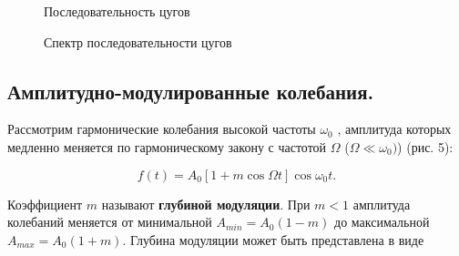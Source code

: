 \documentclass[a4paper, 14pt]{extarticle}%
\begin{document}
	\begin{figure}[h]
		\begin{minipage}[h]{0.5\linewidth}
			\caption{Последовательность цугов}
		\end{minipage}
		\begin{minipage}[h]{0.5\linewidth}
			\caption{Спектр последовательности цугов}
		\end{minipage}
	\end{figure}

	\subsection{Амплитудно-модулированные колебания.}
	Рассмотрим гармонические колебания высокой частоты $\omega_{0}$ , амплитуда которых медленно меняется по гармоническому закону с частотой $\Omega$ ($\Omega \ll \omega_{0})$) (рис. 5):
	
	$$f(t)=A_{0}[1+m\cos\Omega t]\cos \omega_{0}t.$$
	
	Коэффициент $m$ называют \textbf{глубиной модуляции}. При $m<1$ амплитуда колебаний меняется от минимальной $A_{min}=A_{0}(1-m)$ до максимальной $A_{max}=A_{0}(1+m).$ Глубина модуляции может быть представлена в виде
	
\end{document}
